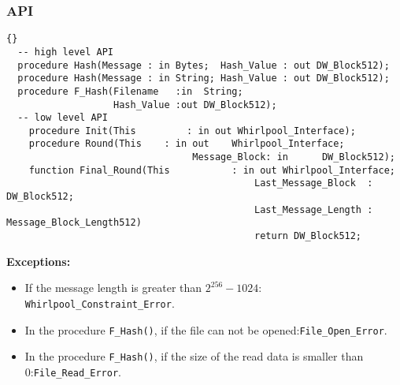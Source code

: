 \subsubsection*{API}
\begin{lstlisting}{}
  -- high level API
  procedure Hash(Message : in Bytes;  Hash_Value : out DW_Block512);
  procedure Hash(Message : in String; Hash_Value : out DW_Block512);
  procedure F_Hash(Filename   :in  String;
                   Hash_Value :out DW_Block512);
  -- low level API
	procedure Init(This 		: in out Whirlpool_Interface);
	procedure Round(This 	: in out 	Whirlpool_Interface;
								 Message_Block: in 		DW_Block512);
	function Final_Round(This 		    : in out Whirlpool_Interface;
											Last_Message_Block  : DW_Block512;
											Last_Message_Length : Message_Block_Length512)
											return DW_Block512;

\end{lstlisting}
\textbf{Exceptions:}
\begin{itemize}
\item If the message length is greater than $2^{256}-1024$:\quad
  \texttt{Whirlpool\_Constraint\_Error}.
\item In the procedure \texttt{F\_Hash()}, if the file can not be
  opened:\quad\texttt{File\_Open\_Error}.
\item In the procedure \texttt{F\_Hash()}, if the size of the read
  data is smaller than 0:\quad\texttt{File\_Read\_Error}.
\end{itemize}
